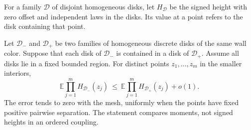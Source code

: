 For a family $\mathcal D$ of disjoint homogeneous disks, let
$H_{\mathcal D}$ be the signed height with zero offset and independent
laws in the disks.  Its value at a point refers to the disk containing
that point.

\begin{lemma}
\label{q4pocket:moment-comparison}
Let $\mathcal D_-$ and $\mathcal D_+$ be two families of homogeneous
discrete disks of the same wall color.  Suppose that each disk of
$\mathcal D_-$ is contained in a disk of $\mathcal D_+$.  Assume all
disks lie in a fixed bounded region.  For distinct points
$z_1,\ldots,z_m$ in the smaller interiors,
\begin{equation}
 \mathbb E\prod_{j=1}^m H_{\mathcal D_-}(z_j)
 \ \leq\
 \mathbb E\prod_{j=1}^m H_{\mathcal D_+}(z_j)+o(1).
 \label{q4pocket:moment-order}
\end{equation}
The error tends to zero with the mesh, uniformly when the points have
fixed positive pairwise separation.  The statement compares moments, not signed
heights in an ordered coupling.
\end{lemma}

